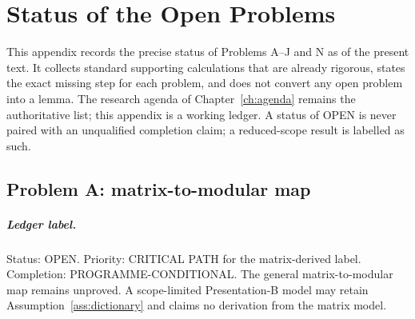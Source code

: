 \chapter{Status of the Open Problems}
\label{app:status}

This appendix records the precise status of Problems A--J and N as of the present text.
It collects standard supporting calculations that are already rigorous, states
the exact missing step for each problem, and does not convert any open problem
into a lemma. The research agenda of Chapter~\ref{ch:agenda} remains the
authoritative list; this appendix is a working ledger. A status of OPEN is
never paired with an unqualified completion claim; a reduced-scope result is
labelled as such.

\section{Problem A: matrix-to-modular map}
\label{sec:status-A}

\paragraph{Ledger label.}
Status: OPEN. Priority: CRITICAL PATH for the matrix-derived label.
Completion: PROGRAMME-CONDITIONAL. The general matrix-to-modular map
remains unproved. A scope-limited Presentation-B model may retain
Assumption~\ref{ass:dictionary} and claims no derivation from the
matrix model.

